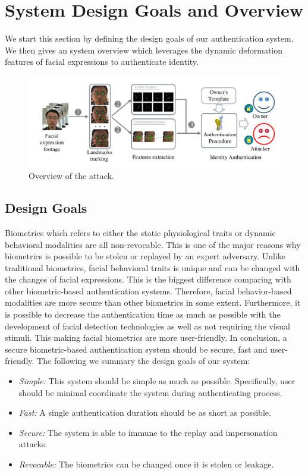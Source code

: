\section{System Design Goals and Overview}
    We start this section by defining the design goals of our authentication system. We then gives an system overview which leverages the dynamic deformation features of facial expressions to authenticate identity. 
    \begin{figure}[!ht]
        \centering
        \includegraphics[width=\textwidth]{fig/overview.pdf}
        \caption{Overview of the attack.}
        \label{fig:overview}
    \end{figure}
    \subsection{Design Goals}
        Biometrics which refers to either the static physiological traits or dynamic behavioral modalities are all non-revocable. This is one of the major reasons why biometrics is possible to be stolen or replayed by an expert adversary. Unlike traditional biometrics, facial behavioral traits is unique and can be changed with the changes of facial expressions. This is the biggest difference comparing with other biometric-based authentication systems. Therefore, facial behavior-based modalities are more secure than other biometrics in some extent.  Furthermore, it is possible to decrease the authentication time as much as possible with the development of facial detection technologies as well as not requiring the visual stimuli. This making facial biometrics are more user-friendly. In conclusion, a secure biometric-based authentication system should be secure, fast and user-friendly. The following we summary the design goals of our system:
        \begin{itemize}
            \item \emph{Simple:} This system should be simple as much as possible. Specifically, user should be minimal coordinate the system during authenticating process.
            \item \emph{Fast:} A single authentication duration should be as short as possible.
            \item \emph{Secure:} The system is able to immune to the replay and impersonation attacks.
            \item \emph{Revocable:} The biometrics can be changed once it is stolen or leakage.
        \end{itemize} 
    
